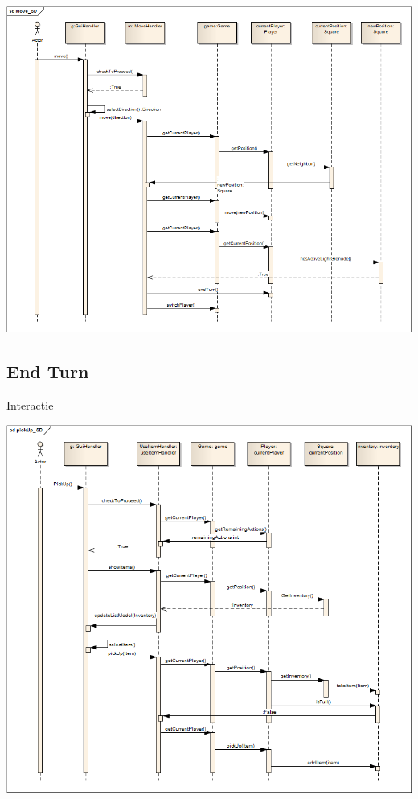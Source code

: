 \documentclass[t]{beamer}
\begin{document}
\begin{frame}[plain]
\begin{center}
\includegraphics[width= 1\linewidth]{../uml/move_SD.png}
\end{center}
\end{frame}

\subsection{End Turn}
\begin{frame}{Interactie}
\begin{multicols}{2}
\tableofcontents[currentsection]
\end{multicols}
\end{frame}

\begin{frame}[plain]
\begin{center}
\includegraphics[width= 0.90\linewidth]{../uml/pickup_SD.png}
\end{center}
\end{frame}
\end{document}
